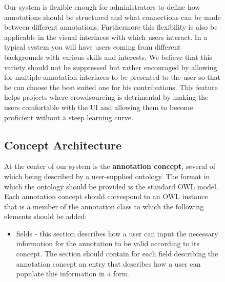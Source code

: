 \documentclass[a4paper, 12pt, notitlepage]{report}
\begin{document}
\begin{figure}[ht]
Our system is flexible enough for administrators to
define how annotations should be structured and what connections can be made between
different annotations.  Furthermore this flexibility is also be applicable in the
visual interfaces with which users interact. In a typical system you will have users
coming from different backgrounds with various skills and interests. We believe that this
variety should not be suppressed but rather encouraged by allowing for multiple annotation
interfaces to be presented to the user so that he can choose the best suited one for his
contributions. This feature helps projects where crowdsourcing is detrimental by making
the users comfortable with the UI and allowing them to become proficient without a steep
learning curve.

\subsection{Concept Architecture}
At the center of our system is the \textbf{annotation concept}, several of which being
described by a user-supplied ontology. The format in which the ontology should be provided
is the standard OWL model.  Each annotation concept should correspond to an OWL instance
that is a member of the annotation class to which the following elements should be added:
\begin{itemize}
\item fields - this section describes how a user can input the necessary information for
  the annotation to be valid according to its concept. The section should contain for each
  field describing the annotation concept an entry that describes how a user can populate
  this information in a form.
  

\end{itemize}
\end{figure}
\end{document}
